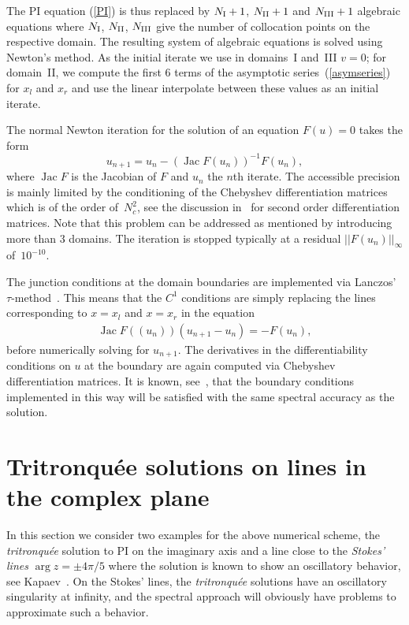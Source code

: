 \documentclass[pdftex]{sigma}
\begin{document}
The PI equation (\ref{PI}) is thus replaced by $N_{\rm I}+1$, $N_{\rm II}+1$ and $N_{\rm III}+1$ algebraic equations where $N_{\rm I}$, $N_{\rm II}$, $N_{\rm III}$ give the number of collocation points on the respective domain. The resulting system of algebraic equations is solved using Newton's method. As the initial iterate we use in domains~I and~III $v=0$; for domain~II, we compute the first 6 terms of the asymptotic series~(\ref{asymseries}) for $x_{l}$ and $x_{r}$ and use the linear interpolate between these values as an initial iterate.

The normal Newton iteration for the solution of an equation $F(u)=0$ takes the form
\begin{equation*}
u_{n+1}=u_{n}-(\operatorname{Jac}F(u_{n}))^{-1}F(u_{n}),
\end{equation*}
where $\operatorname{Jac} F$ is the Jacobian of $F$ and $u_{n}$ the $n$th iterate. The accessible precision is mainly limited by the conditioning of the Chebyshev differentiation matrices which is of the order of~$N_{c}^{2}$, see the discussion in~\cite{trefethen} for second order differentiation matrices. Note that this problem can be addressed as mentioned by introducing more than 3 domains. The iteration is stopped typically at a residual $||F(u_{n})||_{\infty}$ of~$10^{-10}$.

The junction conditions at the domain boundaries are implemented via Lanczos' $\tau$-me\-thod~\cite{tau}. This means that the $C^{1}$ conditions are simply replacing the lines corresponding to $x=x_{l}$ and $x=x_{r}$ in the equation
\begin{gather*}
 \operatorname{Jac}F((u_{n}))(u_{n+1}-u_{n})=-F(u_{n}),
\end{gather*}
before numerically solving for $u_{n+1}$. The derivatives in the differentiability conditions on $u$ at the boundary are again computed via Chebyshev differentiation matrices. It is known, see~\cite{trefethen}, that the boundary conditions implemented in this way will be satisfied with the same spectral accuracy as the solution.

\section{Tritronqu\'ee solutions on lines in the complex plane}\label{section3}
In this section we consider two examples for the above numerical scheme, the \emph{tritronqu\'ee} solution to PI on the imaginary axis and a line close to the \emph{Stokes' lines} $\operatorname{arg}z=\pm 4\pi/5$ where the solution is known to show an oscillatory behavior, see Kapaev~\cite{kap_p1_quasi}. On the Stokes' lines, the \emph{tritronqu\'ee} solutions have an oscillatory singularity at infinity, and the spectral approach will obviously have problems to approximate such a behavior.
\end{document}
